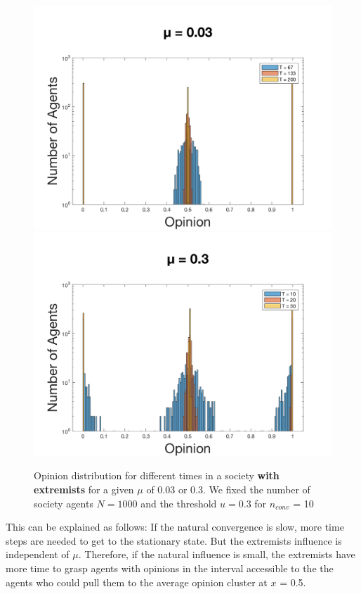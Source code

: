 \documentclass[11pt]{article}
\begin{document}
\begin{figure}[!htb]
  \includegraphics[width=\linewidth]{gen_plot_2017121418225017531e+01.png}
\endminipage\hfill
{}
  \includegraphics[width=\linewidth]{gen_plot_2017121418225354249e+01.png}
\endminipage
\caption{Opinion distribution for different times in a society \textbf{with extremists} for a given $\mu$ of 0.03 or 0.3. We fixed the number of society agents $N = 1000$ and the threshold $u = 0.3$ for $n_{conv}$ = 10}
\label{fig:muwithextremists}
\end{figure}

This can be explained as follows: If the natural convergence is slow, more time steps are needed to get to the stationary state. But the extremists influence is independent of $\mu$. Therefore, if the natural influence is small, the extremists have more time to grasp agents with opinions in the interval accessible to the the agents who could pull them to the average opinion cluster at $x$ = 0.5.
\end{document}
